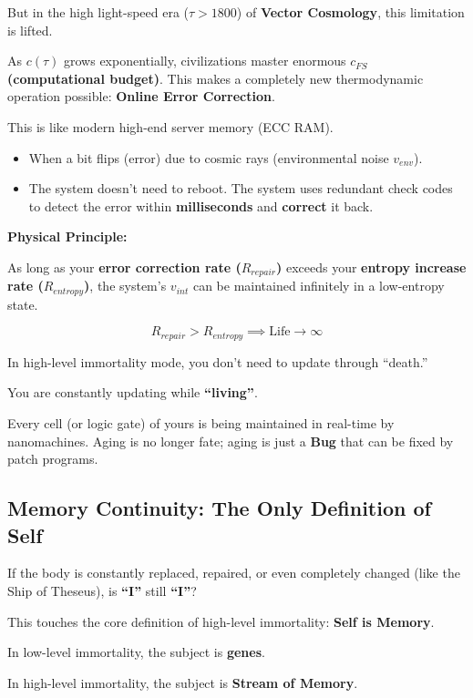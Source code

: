 But in the high light-speed era ($\tau > 1800$) of \textbf{Vector Cosmology}, this limitation is lifted.

As $c(\tau)$ grows exponentially, civilizations master enormous \textbf{$c_{FS}$ (computational budget)}. This makes a completely new thermodynamic operation possible: \textbf{Online Error Correction}.

This is like modern high-end server memory (ECC RAM).

\begin{itemize}
\item When a bit flips (error) due to cosmic rays (environmental noise $v_{env}$).

\item The system doesn't need to reboot. The system uses redundant check codes to detect the error within \textbf{milliseconds} and \textbf{correct} it back.
\end{itemize}

\textbf{Physical Principle:}

As long as your \textbf{error correction rate ($R_{repair}$)} exceeds your \textbf{entropy increase rate ($R_{entropy}$)}, the system's $v_{int}$ can be maintained infinitely in a low-entropy state.

\[R_{repair} > R_{entropy} \implies \text{Life} \to \infty\]

In high-level immortality mode, you don't need to update through ``death.''

You are constantly updating while \textbf{``living''}.

Every cell (or logic gate) of yours is being maintained in real-time by nanomachines. Aging is no longer fate; aging is just a \textbf{Bug} that can be fixed by patch programs.

\subsection{Memory Continuity: The Only Definition of Self}

If the body is constantly replaced, repaired, or even completely changed (like the Ship of Theseus), is \textbf{``I''} still \textbf{``I''}?

This touches the core definition of high-level immortality: \textbf{Self is Memory}.

In low-level immortality, the subject is \textbf{genes}.

In high-level immortality, the subject is \textbf{Stream of Memory}.

